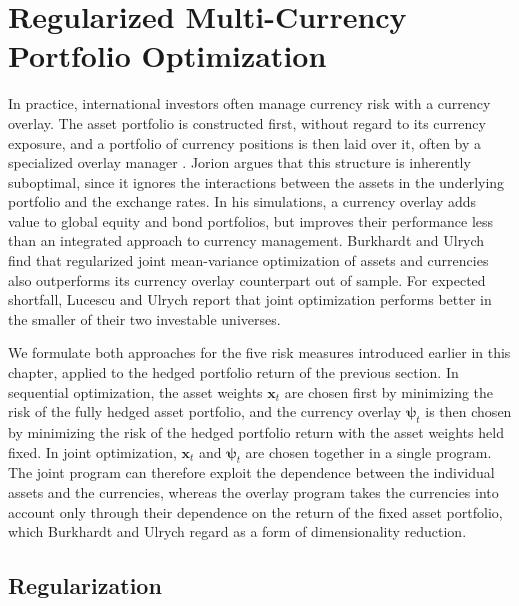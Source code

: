 \section{Regularized Multi-Currency Portfolio Optimization}\label{sec:regularized-multi-currency}

In practice, international investors often manage currency risk with a currency overlay. The asset portfolio is
constructed first, without regard to its currency exposure, and a portfolio of currency positions is then laid over it,
often by a specialized overlay manager \cite{SparseAndStableInternationalPortfolioOptimization}. Jorion
\cite{Jorion1994} argues that this structure is inherently suboptimal, since it ignores the interactions between the
assets in the underlying portfolio and the exchange rates. In his simulations, a currency overlay adds value to global
equity and bond portfolios, but improves their performance less than an integrated approach to currency management.
Burkhardt and Ulrych \cite{SparseAndStableInternationalPortfolioOptimization} find that regularized joint
mean-variance optimization of assets and currencies also outperforms its currency overlay counterpart out of sample. For expected shortfall, Lucescu and Ulrych
\cite{RegularizedMultiCurrencyExpectedShortfallPortfolios} report that joint optimization performs better in the
smaller of their two investable universes. 

We formulate both approaches for the five risk measures introduced earlier in this chapter, applied to the hedged
portfolio return of the previous section. In sequential optimization, the asset weights $\bm{x}_t$ are chosen first by
minimizing the risk of the fully hedged asset portfolio, and the currency overlay $\bm{\psi}_t$ is then chosen by
minimizing the risk of the hedged portfolio return with the asset weights held fixed. In joint optimization,
$\bm{x}_t$ and $\bm{\psi}_t$ are chosen together in a single program. The joint program can therefore exploit the
dependence between the individual assets and the currencies, whereas the overlay program takes the currencies into
account only through their dependence on the return of the fixed asset portfolio, which Burkhardt and Ulrych
\cite{SparseAndStableInternationalPortfolioOptimization} regard as a form of dimensionality reduction. 
\subsection{Regularization}\label{sec:regularization}

